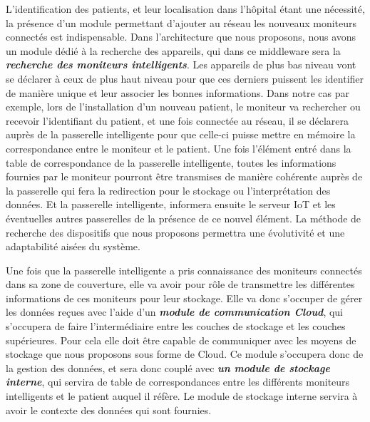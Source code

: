 L’identification des patients, et leur localisation dans l’hôpital étant une nécessité, la présence d’un module permettant d’ajouter au réseau les nouveaux moniteurs connectés est indispensable. Dans l’architecture que nous proposons, nous avons un module dédié à la recherche des appareils, qui dans ce middleware sera la \textbf{\textit{recherche des moniteurs intelligents}}. Les appareils de plus bas niveau vont se déclarer à ceux de plus haut niveau pour que ces derniers puissent les identifier de manière unique et leur associer les bonnes informations. Dans notre cas par exemple, lors de l’installation d’un nouveau patient, le moniteur va rechercher ou recevoir l’identifiant du patient, et une fois connectée au réseau, il se déclarera auprès de la passerelle intelligente pour que celle-ci puisse mettre en mémoire la correspondance entre le moniteur et le patient. Une fois l’élément entré dans la table de correspondance de la passerelle intelligente, toutes les informations fournies par le moniteur pourront être transmises de manière cohérente auprès de la passerelle qui fera la redirection pour le stockage ou l’interprétation des données. Et la passerelle intelligente, informera ensuite le serveur IoT et les éventuelles autres passerelles de la présence de ce nouvel élément. La méthode de recherche des dispositifs que nous proposons permettra une évolutivité et une adaptabilité aisées du système.

Une fois que la passerelle intelligente a pris connaissance des moniteurs connectés dans sa zone de couverture, elle va avoir pour rôle de transmettre les différentes informations de ces moniteurs pour leur stockage. Elle va donc s’occuper de gérer les données reçues avec l’aide d’un \textbf{\textit{module de communication Cloud}}, qui s’occupera de faire l’intermédiaire entre les couches de stockage et les couches supérieures. Pour cela elle doit être capable de communiquer avec les moyens de stockage que nous proposons sous forme de Cloud. Ce module s’occupera donc de la gestion des données, et sera donc couplé avec \textbf{\textit{un module de stockage interne}}, qui servira de table de correspondances entre les différents moniteurs intelligents et le patient auquel il réfère. Le module de stockage interne servira à avoir le contexte des données qui sont fournies.

